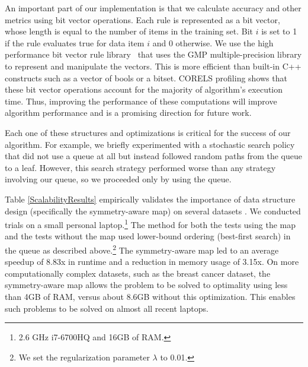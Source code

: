 \documentclass[format=sigconf]{acmart}
\begin{document}
An important part of our implementation is that we calculate accuracy and other metrics using bit vector operations.
Each rule is represented as a bit vector, whose length is equal to the number of items in the training set. 
Bit $i$ is set to 1 if the rule evaluates true for data item $i$ and 0 otherwise.
We use the high performance bit vector rule library~\cite{YangRuSe16}
that uses the GMP multiple-precision library to represent and manipulate the vectors.
This is more efficient than built-in C++ constructs such as a vector of bools or a bitset.
CORELS profiling shows that these bit vector operations account for
the majority of algorithm's execution time.
Thus, improving the performance of these computations will improve algorithm performance and is a promising direction for future work.


Each one of these structures and optimizations is critical for the success of our algorithm.
For example, we briefly experimented with a stochastic search policy that did not use a queue at all but instead followed random paths from the queue to a leaf.
However, this search strategy performed worse than any strategy involving our queue, so we proceeded only by using the queue.

Table \ref{ScalabilityResults} empirically validates the importance of data structure design (specifically the symmetry-aware map) on several datasets \cite{UCI, Bcancer, nyclu:2014}.
We conducted trials on a small personal laptop.\footnote{2.6 GHz i7-6700HQ and 16GB of RAM.}
The method for both the tests using the map and the tests without the map used lower-bound ordering (best-first search) in the queue as described above.\footnote{We set the regularization parameter $\lambda$ to 0.01.}
The symmetry-aware map led to an average speedup of 8.83x in runtime and a reduction in memory usage of 3.15x.
On more computationally complex datasets, such as the breast cancer dataset, the symmetry-aware map allows the problem to be solved to optimality using less than 4GB of RAM, versus about 8.6GB without this optimization.
This enables such problems to be solved on almost all recent laptops.
\end{document}
